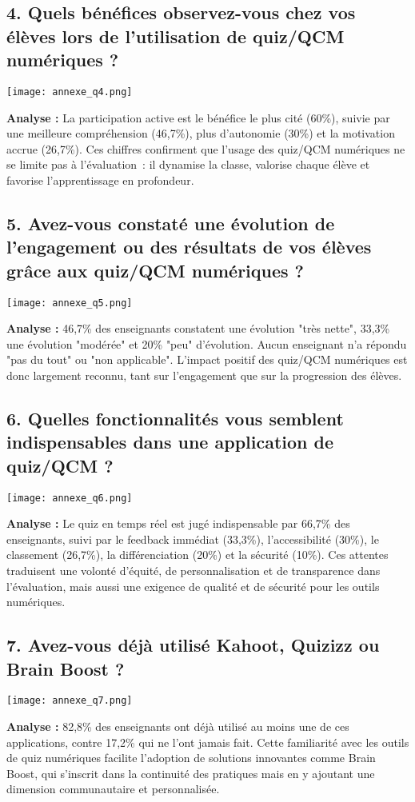 \documentclass[a4paper,11pt]{report}
\begin{document}
\subsection*{4. Quels bénéfices observez-vous chez vos élèves lors de l'utilisation de quiz/QCM numériques ?}
\begin{center}
    \texttt{[image: annexe\_q4.png]}
\end{center}
\textbf{Analyse :} La participation active est le bénéfice le plus cité (60\%), suivie par une meilleure compréhension (46,7\%), plus d'autonomie (30\%) et la motivation accrue (26,7\%). Ces chiffres confirment que l'usage des quiz/QCM numériques ne se limite pas à l'évaluation : il dynamise la classe, valorise chaque élève et favorise l'apprentissage en profondeur.

\subsection*{5. Avez-vous constaté une évolution de l'engagement ou des résultats de vos élèves grâce aux quiz/QCM numériques ?}
\begin{center}
    \texttt{[image: annexe\_q5.png]}
\end{center}
\textbf{Analyse :} 46,7\% des enseignants constatent une évolution "très nette", 33,3\% une évolution "modérée" et 20\% "peu" d'évolution. Aucun enseignant n'a répondu "pas du tout" ou "non applicable". L'impact positif des quiz/QCM numériques est donc largement reconnu, tant sur l'engagement que sur la progression des élèves.

\subsection*{6. Quelles fonctionnalités vous semblent indispensables dans une application de quiz/QCM ?}
\begin{center}
    \texttt{[image: annexe\_q6.png]}
\end{center}
\textbf{Analyse :} Le quiz en temps réel est jugé indispensable par 66,7\% des enseignants, suivi par le feedback immédiat (33,3\%), l'accessibilité (30\%), le classement (26,7\%), la différenciation (20\%) et la sécurité (10\%). Ces attentes traduisent une volonté d'équité, de personnalisation et de transparence dans l'évaluation, mais aussi une exigence de qualité et de sécurité pour les outils numériques.

\subsection*{7. Avez-vous déjà utilisé Kahoot, Quizizz ou Brain Boost ?}
\begin{center}
    \texttt{[image: annexe\_q7.png]}
\end{center}
\textbf{Analyse :} 82,8\% des enseignants ont déjà utilisé au moins une de ces applications, contre 17,2\% qui ne l'ont jamais fait. Cette familiarité avec les outils de quiz numériques facilite l'adoption de solutions innovantes comme Brain Boost, qui s'inscrit dans la continuité des pratiques mais en y ajoutant une dimension communautaire et personnalisée.
\end{document}
